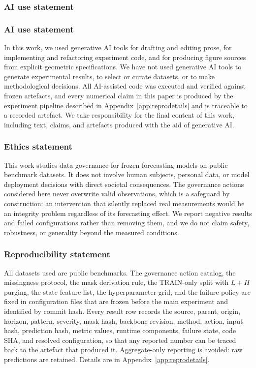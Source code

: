 \documentclass{article}
\begin{document}
\subsubsection*{AI use statement}

\subsubsection*{AI use statement}
In this work, we used generative AI tools for drafting and editing prose, for
implementing and refactoring experiment code, and for producing figure sources from
explicit geometric specifications. We have not used generative AI tools to generate
experimental results, to select or curate datasets, or to make methodological decisions.
All AI-assisted code was executed and verified against frozen artefacts, and every
numerical claim in this paper is produced by the experiment pipeline described in
Appendix~\ref{app:reprodetails} and is traceable to a recorded artefact. We take
responsibility for the final content of this work, including text, claims, and artefacts
produced with the aid of generative AI.
\subsubsection*{Ethics statement}
This work studies data governance for frozen forecasting models on public benchmark
datasets. It does not involve human subjects, personal data, or model deployment
decisions with direct societal consequences. The governance actions considered here never
overwrite valid observations, which is a safeguard by construction: an intervention that
silently replaced real measurements would be an integrity problem regardless of its
forecasting effect. We report negative results and failed configurations rather than
removing them, and we do not claim safety, robustness, or generality beyond the measured
conditions.

\subsubsection*{Reproducibility statement}
All datasets used are public benchmarks. The governance action catalog, the missingness
protocol, the mask derivation rule, the TRAIN-only split with $L+H$ purging, the state
feature list, the hyperparameter grid, and the failure policy are fixed in configuration
files that are frozen before the main experiment and identified by commit hash. Every
result row records the source, parent, origin, horizon, pattern, severity, mask hash,
backbone revision, method, action, input hash, prediction hash, metric values, runtime
components, failure state, code SHA, and resolved configuration, so that any reported
number can be traced back to the artefact that produced it. Aggregate-only reporting is
avoided: raw predictions are retained. Details are in Appendix~\ref{app:reprodetails}.
\end{document}

